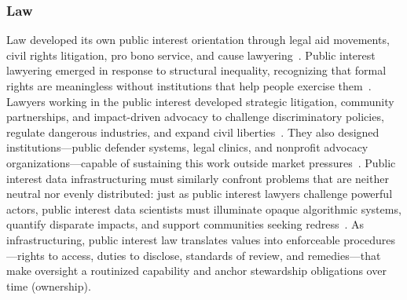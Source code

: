 \documentclass[acmsmall,screen]{acmart}
\begin{document}
\subsubsection*{Law}
Law developed its own public interest orientation through legal aid movements, civil rights litigation, pro bono service, and cause lawyering~\cite{council1976balancing,rhode2004probono,sarat1998cause,cummings2009public}. Public interest lawyering emerged in response to structural inequality, recognizing that formal rights are meaningless without institutions that help people exercise them~\cite{southworth2005what,cummings2006after,trubek2011public}. Lawyers working in the public interest developed strategic litigation, community partnerships, and impact-driven advocacy to challenge discriminatory policies, regulate dangerous industries, and expand civil liberties~\cite{cummings2009public,nielsen2006organization,albiston2017public}. They also designed institutions---public defender systems, legal clinics, and nonprofit advocacy organizations---capable of sustaining this work outside market pressures~\cite{rhode2004probono,albiston2017public}. Public interest data infrastructuring must similarly confront problems that are neither neutral nor evenly distributed: just as public interest lawyers challenge powerful actors, public interest data scientists must illuminate opaque algorithmic systems, quantify disparate impacts, and support communities seeking redress~\cite{barocas2016big,selbst2019fairness}. As infrastructuring, public interest law translates values into enforceable procedures---rights to access, duties to disclose, standards of review, and remedies---that make oversight a routinized capability and anchor stewardship obligations over time (ownership).
\end{document}
